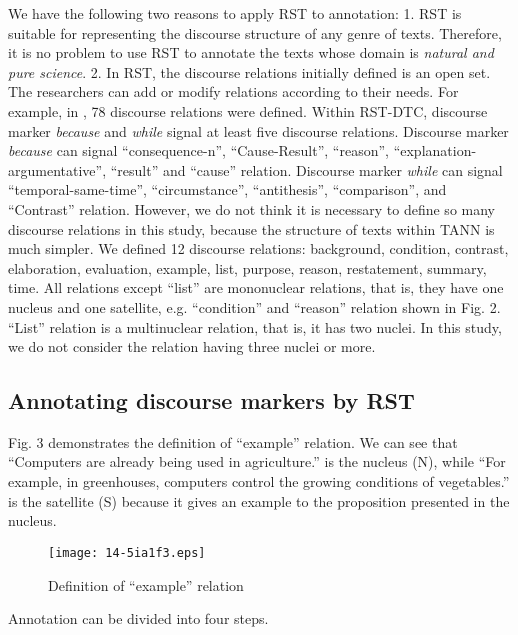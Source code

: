 \documentclass[english]{jnlp_1.3e}
\begin{document}
We have the following two reasons to apply RST to annotation: 1. 
RST is suitable for representing the discourse structure of any 
genre of texts. Therefore, it is no problem to use RST to annotate 
the texts whose domain is \textit{natural and pure science}.
2. In RST, the discourse relations initially defined is an open set.
The researchers can add or modify relations according to their 
needs. For example, in \cite{Carlson01}, 78 discourse relations 
were defined. Within RST-DTC, discourse marker \textit{because} 
and \textit{while} signal at least five discourse relations. 
Discourse marker \textit{because} can signal ``consequence-n'', 
``Cause-Result'', ``reason'', ``explanation-argumentative'', 
``result'' and ``cause'' relation. Discourse marker \textit{while} 
can signal ``temporal-same-time'', ``circumstance'', ``antithesis'', 
``comparison'', and ``Contrast'' relation. However, we do not think 
it is necessary to define so many discourse relations in this study, 
because the structure of texts within TANN is much simpler. 
We defined 12 discourse relations: background, condition, contrast,
elaboration, evaluation, example, list, purpose, reason, restatement, 
summary, time. All relations except ``list'' are mononuclear relations, 
that is, they have one nucleus and one satellite, e.g. ``condition'' 
and ``reason'' relation shown in Fig. 2. ``List'' relation is a 
multinuclear relation, that is, it has two nuclei. In this study, 
we do not consider the relation having three nuclei or more.

\subsection{Annotating discourse markers by RST}

Fig. 3 demonstrates the definition of ``example'' relation. 
We can see that ``Computers are already being used in agriculture.'' is
the nucleus (N), while ``For example, in greenhouses, computers control 
the growing conditions of vegetables.'' is the satellite (S) because 
it gives an example to the proposition presented in the nucleus.

\begin{figure}[b]
\begin{center}
\texttt{[image: 14-5ia1f3.eps]}
\end{center}
 \caption{Definition of ``example'' relation}
\end{figure}

Annotation can be divided into four steps. 
\end{document}
